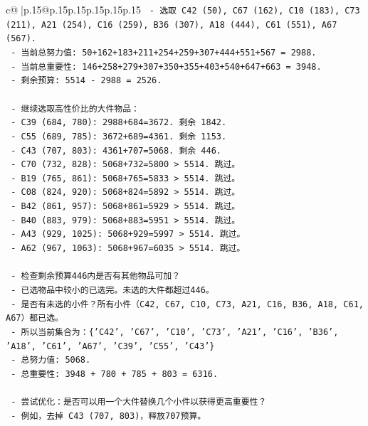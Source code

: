 \documentclass{article}
\begin{document}
{\begin{supertabular}{c@{$\;$}|p{.15\linewidth}@{}p{.15\linewidth}p{.15\linewidth}p{.15\linewidth}p{.15\linewidth}p{.15\linewidth}}
{{{\texttt{   {-} 选取 C42 (50), C67 (162), C10 (183), C73 (211), A21 (254), C16 (259), B36 (307), A18 (444), C61 (551), A67 (567).} \\
\texttt{   {-} 当前总努力值: 50+162+183+211+254+259+307+444+551+567 = 2988.} \\
\texttt{   {-} 当前总重要性: 146+258+279+307+350+355+403+540+647+663 = 3948.} \\
\texttt{   {-} 剩余预算: 5514 {-} 2988 = 2526.} \\
\\ 
\texttt{   {-} 继续选取高性价比的大件物品：} \\
\texttt{   {-} C39 (684, 780): 2988+684=3672. 剩余 1842.} \\
\texttt{   {-} C55 (689, 785): 3672+689=4361. 剩余 1153.} \\
\texttt{   {-} C43 (707, 803): 4361+707=5068. 剩余 446.} \\
\texttt{   {-} C70 (732, 828): 5068+732=5800 > 5514. 跳过。} \\
\texttt{   {-} B19 (765, 861): 5068+765=5833 > 5514. 跳过。} \\
\texttt{   {-} C08 (824, 920): 5068+824=5892 > 5514. 跳过。} \\
\texttt{   {-} B42 (861, 957): 5068+861=5929 > 5514. 跳过。} \\
\texttt{   {-} B40 (883, 979): 5068+883=5951 > 5514. 跳过。} \\
\texttt{   {-} A43 (929, 1025): 5068+929=5997 > 5514. 跳过。} \\
\texttt{   {-} A62 (967, 1063): 5068+967=6035 > 5514. 跳过。} \\
\\ 
\texttt{   {-} 检查剩余预算446内是否有其他物品可加？} \\
\texttt{   {-} 已选物品中较小的已选完。未选的大件都超过446。} \\
\texttt{   {-} 是否有未选的小件？所有小件（C42, C67, C10, C73, A21, C16, B36, A18, C61, A67）都已选。} \\
\texttt{   {-} 所以当前集合为：\{'C42', 'C67', 'C10', 'C73', 'A21', 'C16', 'B36', 'A18', 'C61', 'A67', 'C39', 'C55', 'C43'\}} \\
\texttt{   {-} 总努力值: 5068.} \\
\texttt{   {-} 总重要性: 3948 + 780 + 785 + 803 = 6316.} \\
\\ 
\texttt{   {-} 尝试优化：是否可以用一个大件替换几个小件以获得更高重要性？} \\
\texttt{   {-} 例如，去掉 C43 (707, 803)，释放707预算。} \\
}}}
\end{supertabular}}
\end{document}
